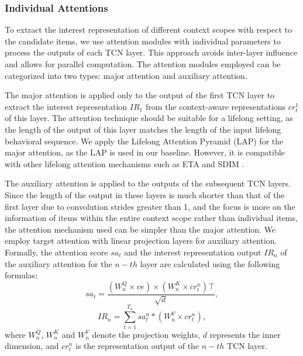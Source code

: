 \subsubsection{Individual Attentions}

To extract the interest representation of different context scopes with respect to the candidate items, we use attention modules with individual parameters to process the outputs of each TCN layer. This approach avoids inter-layer influence and allows for parallel computation. The attention modules employed can be categorized into two types: major attention and auxiliary attention. 

The major attention is applied only to the output of the first TCN layer to extract the interest representation $IR_1$ from the context-aware representations $cr^1_t$ of this layer. The attention technique should be suitable for a lifelong setting, as the length of the output of this layer matches the length of the input lifelong behavioral sequence. We apply the Lifelong Attention Pyramid (LAP) \cite{hou2024cross} for the major attention, as the LAP is used in our baseline. However, it is compatible with other lifelong attention mechanisms such as ETA \cite{chen2022efficient} and SDIM \cite{cao2022sampling}. 

The auxiliary attention is applied to the outputs of the subsequent TCN layers. Since the length of the output in these layers is much shorter than that of the first layer due to convolution strides greater than 1, and the focus is more on the information of items within the entire context scope rather than individual items, the attention mechanism used can be simpler than the major attention. We employ target attention with linear projection layers for auxiliary attention. Formally, the attention score $sa_t$ and the interest representation output $IR_n$ of the auxiliary attention for the $n-th$ layer are calculated using the following formulas: 
\begin{equation}
    sa_t = \frac{(W^Q_n \times ve) \times (W^K_n \times cr^n_t)\top}{\sqrt{d}},
\label{eq:attention_aux3}
\end{equation}
\begin{equation}
    IR_n = \sum_{t=1}^{T_n} sa^n_t*(W^V_n \times cr^n_t),
\label{eq:attention_aux4}
\end{equation}
where $W^Q_n$, $W^K_n$ and $W^V_n$ denote the projection weights, $d$ represents the inner dimension, and $cr^n_t$ is the representation output of the $n-th$ TCN layer. 

